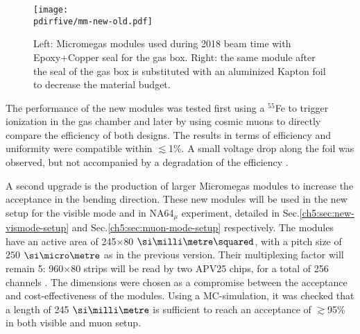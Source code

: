 \begin{figure}[bth!]
  \centering
  \texttt{[image: \\pdirfive/mm-new-old.pdf]}
  \caption[Previous version and new Micromegas design of the gas box seal]{Left: Micromegas modules used during 2018 beam time with Epoxy+Copper seal for the gas box. Right: the same module after the seal of the gas box is substituted with an aluminized Kapton foil to decrease the material budget.}
  \label{fig:mm-old-new}
\end{figure}

The performance of the new modules was tested first using a $^{55}$Fe to trigger ionization in the gas chamber and later by using cosmic muons to directly compare the efficiency of both designs. The results in terms of efficiency and uniformity were compatible within $\lesssim$1\%. A small voltage drop along the foil was observed, but not accompanied by a degradation of the efficiency \cite{philip-swork}.

A second upgrade is the production of larger Micromegas modules to increase the acceptance in the bending direction. These new modules will be used in the new setup for the visible mode and in NA64$_{\mu}$ experiment, detailed in Sec.\ref{ch5:sec:new-vismode-setup} and Sec.\ref{ch5:sec:muon-mode-setup} respectively. The modules have an active area of 245$\times$80 $\mms$, with a pitch size of $250$ $\mum$ as in the previous version. Their multiplexing factor will remain 5:  960$\times$80 strips will be read by two APV25 chips, for a total of 256 channels \cite{apv-useguide}. The dimensions were chosen as a compromise between the acceptance and cost-effectiveness of the modules. Using a MC-simulation, it was checked that a length of 245 $\mmi$ is sufficient to reach an acceptance of $\gtrsim$95\% in both visible and muon setup.

